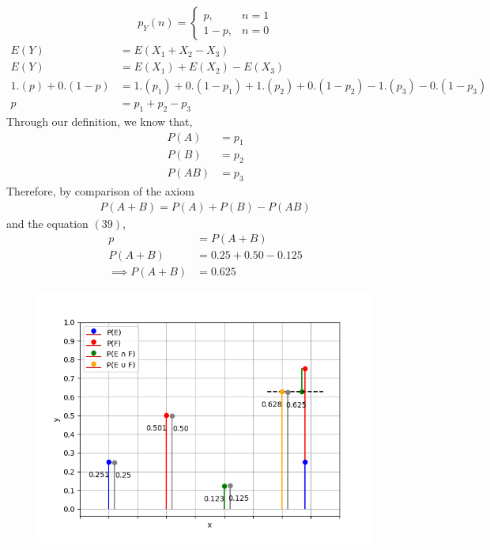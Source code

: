 \documentclass[journal]{IEEEtran}
\begin{document}
\begin{align}
	p_Y(n) =
	\begin{cases}
		p ,& n = 1\\
		1 - p ,& n = 0
	\end{cases}
\end{align}
\begin{align}
	E(Y) &= E(X_1 + X_2 - X_3)\\
	E(Y) &= E(X_1) + E(X_2) - E(X_3)\\
	1.(p) + 0.(1 - p) &= 1.(p_1) + 0.(1 - p_1) + 1.(p_2) + 0.(1 - p_2) - 1.(p_3) - 0.(1 - p_3)\\
	p &= p_1 + p_2 - p_3
\end{align}
Through our definition, we know that,
\begin{align}
	P(A) &= p_1\\
	P(B) &= p_2\\
	P(AB) &= p_3
\end{align}
Therefore, by comparison of the axiom
\begin{align}
	P(A + B) = P(A) + P(B) - P(AB)
\end{align}
and the equation \((39)\),
\begin{align}
	p &= P(A + B)\\
	P(A + B) &= 0.25 + 0.50 - 0.125\\
	\implies P(A + B) &= 0.625
\end{align}
\begin{figure}[h]
\centering
\includegraphics[width=\columnwidth]{figs/Figure_1.png}
\end{figure}
\end{document}
